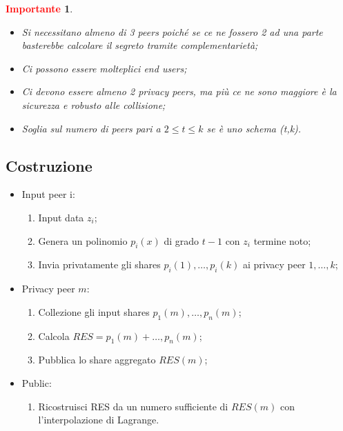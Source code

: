 \documentclass{book}
\newtheorem*{Importante}{\textbf{\textcolor{red}{Importante}}}
\begin{document}
\begin{Importante}
	\begin{itemize}
		\item Si necessitano almeno di 3 peers poiché se ce ne fossero 2 ad una parte basterebbe calcolare il segreto tramite complementarietà;
		\item Ci possono essere molteplici end users;
		\item Ci devono essere almeno 2 privacy peers, ma più ce ne sono maggiore è la sicurezza e robusto alle collisione;
		\item Soglia sul numero di peers pari a \(2\leq t\leq k\) se è uno schema (t,k).
	\end{itemize}
\end{Importante}
\subsection{Costruzione}
\begin{itemize}
	\item Input peer i:\begin{enumerate}
		      \item Input data \(z_{i}\);
		      \item Genera un polinomio \(p_{i}(x)\) di grado \(t-1\) con \(z_{i}\) termine noto;
		      \item Invia privatamente gli shares \(p_{i}(1),\dots,p_{i}(k)\) ai privacy peer \(1,\dots,k\);
	      \end{enumerate}
	\item Privacy peer \(m\):\begin{enumerate}
		      \item Collezione gli input shares \(p_{1}(m),\dots,p_{n}(m)\);
		      \item Calcola \(RES=p_{1}(m)+\dots,p_{n}(m)\);
		      \item Pubblica lo share aggregato \(RES(m)\);
	      \end{enumerate}
	\item Public:\begin{enumerate}
		      \item Ricostruisci RES da un numero sufficiente di \(RES(m)\) con l'interpolazione di Lagrange.
	      \end{enumerate}
\end{itemize}
\end{document}
